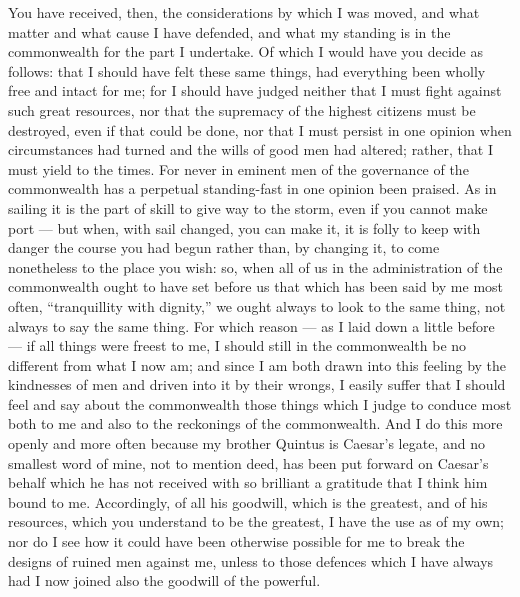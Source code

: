  You have received, then, the considerations by which I was moved, and what matter and what cause I have defended, and what my standing is in the commonwealth for the part I undertake. Of which I would have you decide as follows: that I should have felt these same things, had everything been wholly free and intact for me; for I should have judged neither that I must fight against such great resources, nor that the supremacy of the highest citizens must be destroyed, even if that could be done, nor that I must persist in one opinion when circumstances had turned and the wills of good men had altered; rather, that I must yield to the times. For never in eminent men of the governance of the commonwealth has a perpetual standing-fast in one opinion been praised. As in sailing it is the part of skill to give way to the storm, even if you cannot make port --- but when, with sail changed, you can make it, it is folly to keep with danger the course you had begun rather than, by changing it, to come nonetheless to the place you wish: so, when all of us in the administration of the commonwealth ought to have set before us that which has been said by me most often, ``tranquillity with dignity,'' we ought always to look to the same thing, not always to say the same thing. For which reason --- as I laid down a little before --- if all things were freest to me, I should still in the commonwealth be no different from what I now am; and since I am both drawn into this feeling by the kindnesses of men and driven into it by their wrongs, I easily suffer that I should feel and say about the commonwealth those things which I judge to conduce most both to me and also to the reckonings of the commonwealth. And I do this more openly and more often because my brother Quintus is Caesar's legate, and no smallest word of mine, not to mention deed, has been put forward on Caesar's behalf which he has not received with so brilliant a gratitude that I think him bound to me. Accordingly, of all his goodwill, which is the greatest, and of his resources, which you understand to be the greatest, I have the use as of my own; nor do I see how it could have been otherwise possible for me to break the designs of ruined men against me, unless to those defences which I have always had I now joined also the goodwill of the powerful.

